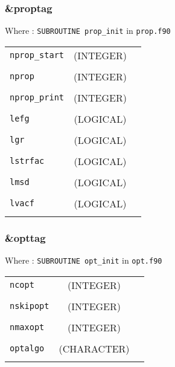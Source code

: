 \documentclass[10pt,a4paper]{article}
\begin{document}
\subsubsection{\&proptag}

Where : \verb?SUBROUTINE prop_init? in \verb?prop.f90?

\begin{tabular}{lcc}
\\
\verb?nprop_start? & (INTEGER)  & \\
\\
\verb?nprop?       & (INTEGER)  & \\
\\
\verb?nprop_print? & (INTEGER)  & \\
\\
\verb?lefg?        & (LOGICAL)  & \\
\\
\verb?lgr?         & (LOGICAL)  & \\
\\
\verb?lstrfac?     & (LOGICAL)  & \\
\\
\verb?lmsd?        & (LOGICAL)  & \\
\\
\verb?lvacf?       & (LOGICAL)  & \\
\\
\end{tabular}

\subsubsection{\&opttag}

Where : \verb?SUBROUTINE opt_init? in \verb?opt.f90?

\begin{tabular}{lcc}
\\
\verb?ncopt?     & (INTEGER) & \\

\\
\verb?nskipopt?  & (INTEGER) & \\

\\
\verb?nmaxopt?   & (INTEGER) & \\

\\
\verb?optalgo?   & (CHARACTER) & \\
\\
\end{tabular}
\end{document}
